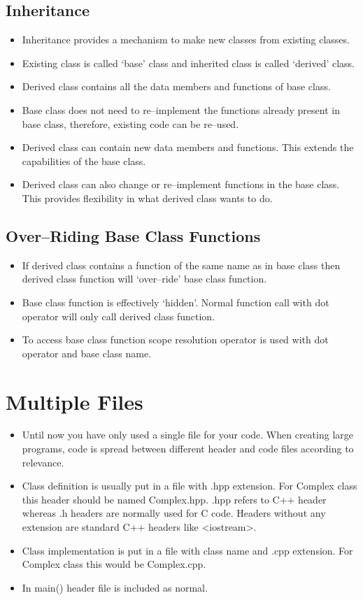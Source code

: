 \documentclass[12pt,a4paper]{article}
\begin{document}
\subsection{Inheritance}
\begin{itemize}
\item Inheritance provides a mechanism to make new classes from existing classes.
\item Existing class is called `base' class and inherited class is called `derived' class.
\item Derived class contains all the data members and functions of base class.
\item Base class does not need to re--implement the functions already present in base class, therefore, existing code can be re--used.
\item Derived class can contain new data members and functions. This extends the capabilities of the base class.
\item Derived class can also change or re--implement functions in the base class. This provides flexibility in what derived class wants to do.
\end{itemize}
\subsection{Over--Riding Base Class Functions}
\begin{itemize}
\item If derived class contains a function of the same name as in base class then derived class function will `over--ride' base class function.
\item Base class function is effectively `hidden'. Normal function call with dot operator will only call derived class function.
\item To access base class function scope resolution operator is used with dot operator and base class name.
\end{itemize}
\section{Multiple Files}
\begin{itemize}
\item Until now you have only used a single file for your code. When creating large programs, code is spread between different header and code files according to relevance.
\item Class definition is usually put in a file with .hpp extension. For Complex class this header should be named Complex.hpp. .hpp refers to C++ header whereas .h headers are normally used for C code. Headers without any extension are standard C++ headers like <iostream>.
\item Class implementation is put in a file with class name and .cpp extension. For Complex class this would be Complex.cpp.
\item In main() header file is included as normal.
\end{itemize}
\end{document}
